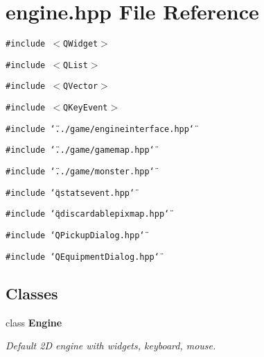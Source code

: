 \section{engine.hpp File Reference}
\label{engine_8hpp}
{\tt \#include $<$QWidget$>$}\par
{\tt \#include $<$QList$>$}\par
{\tt \#include $<$QVector$>$}\par
{\tt \#include $<$QKey\-Event$>$}\par
{\tt \#include \char`\"{}../game/engineinterface.hpp\char`\"{}}\par
{\tt \#include \char`\"{}../game/gamemap.hpp\char`\"{}}\par
{\tt \#include \char`\"{}../game/monster.hpp\char`\"{}}\par
{\tt \#include \char`\"{}qstatsevent.hpp\char`\"{}}\par
{\tt \#include \char`\"{}qdiscardablepixmap.hpp\char`\"{}}\par
{\tt \#include \char`\"{}QPickup\-Dialog.hpp\char`\"{}}\par
{\tt \#include \char`\"{}QEquipment\-Dialog.hpp\char`\"{}}\par
\subsection*{Classes}
\begin{CompactItemize}
\item 
class {\bf Engine}
\begin{CompactList}\small\item\em Default 2D engine with widgets, keyboard, mouse. \item\end{CompactList}\end{CompactItemize}
